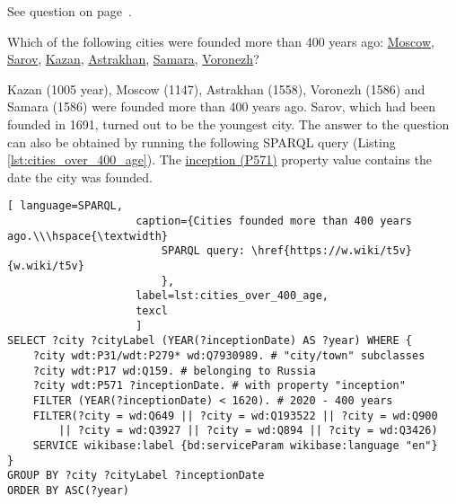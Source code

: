 See question on page~\pageref{question:cities_geographic_objects}.


\begin{exercise}%
    \label{answer:cities_over_400_age}
Which of the following cities were founded more than 400 years ago: \href{https://w.wiki/pzt}{Moscow}, \href{https://w.wiki/pzu}{Sarov}, \href{https://w.wiki/pzx}{Kazan}, \href{https://w.wiki/pzy}{Astrakhan}, \href{https://w.wiki/pzz}{Samara}, \href{https://w.wiki/pz$}{Voronezh}?
\end{exercise}

Kazan (1005 year), Moscow (1147), Astrakhan (1558), Voronezh (1586) and Samara (1586) were founded more than 400 years ago. Sarov, which had been founded in 1691, turned out to be the youngest city. The answer to the question can also be obtained by running the following SPARQL query (Listing \ref{lst:cities_over_400_age}). The \href{https://www.wikidata.org/wiki/Property:P571}{inception (P571)} property value contains the date the city was founded.

\begin{lstlisting}[ language=SPARQL, 
                    caption={Cities founded more than 400 years ago.\\\hspace{\textwidth}
                        SPARQL query: \href{https://w.wiki/t5v}{w.wiki/t5v}
                        },
                    label=lst:cities_over_400_age,
                    texcl 
                    ]
SELECT ?city ?cityLabel (YEAR(?inceptionDate) AS ?year) WHERE {
	?city wdt:P31/wdt:P279* wd:Q7930989. # "city/town" subclasses
	?city wdt:P17 wd:Q159. # belonging to Russia
	?city wdt:P571 ?inceptionDate. # with property "inception"  
	FILTER (YEAR(?inceptionDate) < 1620). # 2020 - 400 years
	FILTER(?city = wd:Q649 || ?city = wd:Q193522 || ?city = wd:Q900
		|| ?city = wd:Q3927 || ?city = wd:Q894 || ?city = wd:Q3426)
	SERVICE wikibase:label {bd:serviceParam wikibase:language "en"}
}
GROUP BY ?city ?cityLabel ?inceptionDate
ORDER BY ASC(?year)
\end{lstlisting}%

